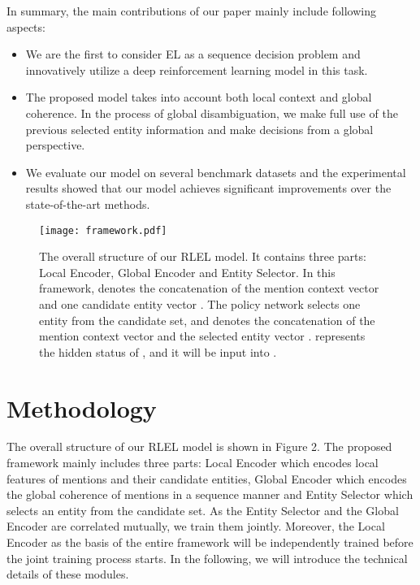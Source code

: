 \documentclass[sigconf]{acmart}
\begin{document}
In summary, the main contributions of our paper mainly include following aspects:
\begin{itemize}

\item We are the first to consider EL as a sequence decision problem and innovatively utilize a deep reinforcement learning model in this task.

\item The proposed model takes into account both local context and global coherence. In the process of global disambiguation, we make full use of the previous selected entity information and make decisions from a global perspective.

\item We evaluate our model on several benchmark datasets and the experimental results showed that our model achieves significant improvements over the state-of-the-art methods.
\end{itemize}

\begin{figure*}[t]
\centering
\texttt{[image: framework.pdf]}
\caption{The overall structure of our RLEL model. It contains three parts: Local Encoder, Global Encoder and Entity Selector. In this framework,  denotes the concatenation of the mention context vector  and one candidate entity vector . The policy network selects one entity from the candidate set, and  denotes the concatenation of the mention context vector  and the selected entity vector .  represents the hidden status of , and it will be input into .}

\end{figure*}

\section{Methodology}
The overall structure of our RLEL model is shown in Figure 2. The proposed framework mainly includes three parts: Local Encoder which encodes local features of mentions and their candidate entities, Global Encoder which encodes the global coherence of mentions in a sequence manner and Entity Selector which selects an entity from the candidate set. As the Entity Selector and the Global Encoder are correlated mutually, we train them jointly. Moreover, the Local Encoder as the basis of the entire framework will be independently trained before the joint training process starts. In the following, we will introduce the technical details of these modules.
\end{document}
